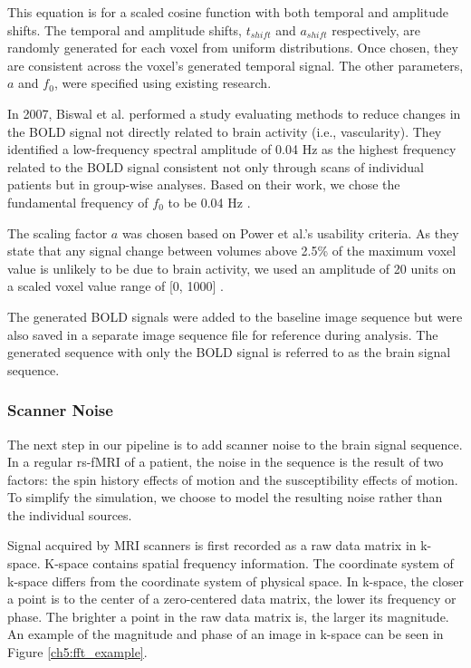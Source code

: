 \noindent This equation is for a scaled cosine function with both temporal and amplitude shifts. The temporal and amplitude shifts, $t_{shift}$ and $a_{shift}$ respectively, are randomly generated for each voxel from uniform distributions. Once chosen, they are consistent across the voxel's generated temporal signal. The other parameters, $a$ and $f_0$, were specified using existing research. 

In 2007, Biswal et al. performed a study evaluating methods to reduce changes in the BOLD signal not directly related to brain activity (i.e., vascularity). They identified a low-frequency spectral amplitude of 0.04 Hz as the highest frequency related to the BOLD signal consistent not only through scans of individual patients but in group-wise analyses. Based on their work, we chose the fundamental frequency of $f_0$ to be 0.04 Hz \cite{Biswal2007}. 

The scaling factor $a$ was chosen based on Power et al.'s usability criteria. As they state that any signal change between volumes above 2.5\% of the maximum voxel value is unlikely to be due to brain activity, we used an amplitude of 20 units on a scaled voxel value range of [0, 1000] \cite{Power2012}. 

The generated BOLD signals were added to the baseline image sequence but were also saved in a separate image sequence file for reference during analysis. The generated sequence with only the BOLD signal is referred to as the brain signal sequence.

\subsubsection{Scanner Noise}

The next step in our pipeline is to add scanner noise to the brain signal sequence. In a regular rs-fMRI of a patient, the noise in the sequence is the result of two factors: the spin history effects of motion and the susceptibility effects of motion. To simplify the simulation, we choose to model the resulting noise rather than the individual sources.

Signal acquired by MRI scanners is first recorded as a raw data matrix in k-space. K-space contains spatial frequency information. The coordinate system of k-space differs from the coordinate system of physical space. In k-space, the closer a point is to the center of a zero-centered data matrix, the lower its frequency or phase. The brighter a point in the raw data matrix is, the larger its magnitude. An example of the magnitude and phase of an image in k-space can be seen in Figure \ref{ch5:fft_example}.

